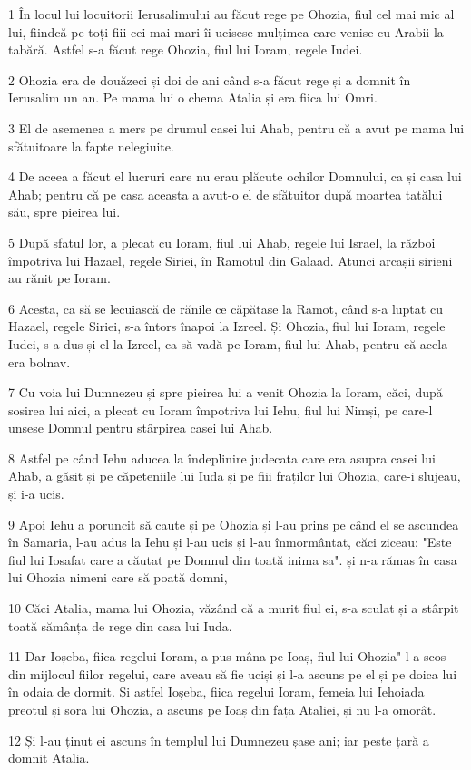 \par 1 În locul lui locuitorii Ierusalimului au făcut rege pe Ohozia, fiul cel mai mic al lui, fiindcă pe toți fiii cei mai mari îi ucisese mulțimea care venise cu Arabii la tabără. Astfel s-a făcut rege Ohozia, fiul lui Ioram, regele Iudei.
\par 2 Ohozia era de douăzeci și doi de ani când s-a făcut rege și a domnit în Ierusalim un an. Pe mama lui o chema Atalia și era fiica lui Omri.
\par 3 El de asemenea a mers pe drumul casei lui Ahab, pentru că a avut pe mama lui sfătuitoare la fapte nelegiuite.
\par 4 De aceea a făcut el lucruri care nu erau plăcute ochilor Domnului, ca și casa lui Ahab; pentru că pe casa aceasta a avut-o el de sfătuitor după moartea tatălui său, spre pieirea lui.
\par 5 După sfatul lor, a plecat cu Ioram, fiul lui Ahab, regele lui Israel, la război împotriva lui Hazael, regele Siriei, în Ramotul din Galaad. Atunci arcașii sirieni au rănit pe Ioram.
\par 6 Acesta, ca să se lecuiască de rănile ce căpătase la Ramot, când s-a luptat cu Hazael, regele Siriei, s-a întors înapoi la Izreel. Și Ohozia, fiul lui Ioram, regele Iudei, s-a dus și el la Izreel, ca să vadă pe Ioram, fiul lui Ahab, pentru că acela era bolnav.
\par 7 Cu voia lui Dumnezeu și spre pieirea lui a venit Ohozia la Ioram, căci, după sosirea lui aici, a plecat cu Ioram împotriva lui Iehu, fiul lui Nimși, pe care-l unsese Domnul pentru stârpirea casei lui Ahab.
\par 8 Astfel pe când Iehu aducea la îndeplinire judecata care era asupra casei lui Ahab, a găsit și pe căpeteniile lui Iuda și pe fiii fraților lui Ohozia, care-i slujeau, și i-a ucis.
\par 9 Apoi Iehu a poruncit să caute și pe Ohozia și l-au prins pe când el se ascundea în Samaria, l-au adus la Iehu și l-au ucis și l-au înmormântat, căci ziceau: "Este fiul lui Iosafat care a căutat pe Domnul din toată inima sa". și n-a rămas în casa lui Ohozia nimeni care să poată domni,
\par 10 Căci Atalia, mama lui Ohozia, văzând că a murit fiul ei, s-a sculat și a stârpit toată sămânța de rege din casa lui Iuda.
\par 11 Dar Ioșeba, fiica regelui Ioram, a pus mâna pe Ioaș, fiul lui Ohozia" l-a scos din mijlocul fiilor regelui, care aveau să fie uciși și l-a ascuns pe el și pe doica lui în odaia de dormit. Și astfel Ioșeba, fiica regelui Ioram, femeia lui Iehoiada preotul și sora lui Ohozia, a ascuns pe Ioaș din fața Ataliei, și nu l-a omorât.
\par 12 Și l-au ținut ei ascuns în templul lui Dumnezeu șase ani; iar peste țară a domnit Atalia.

